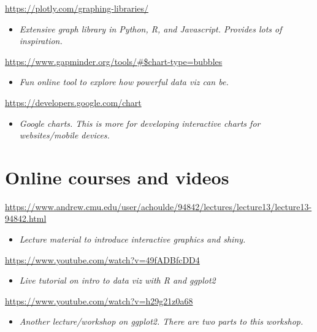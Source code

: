 \documentclass[
]{book}
\providecommand{\tightlist}{%
  \setlength{\itemsep}{0pt}\setlength{\parskip}{0pt}}
\begin{document}
\url{https://plotly.com/graphing-libraries/}

\begin{itemize}
\tightlist
\item
  \emph{Extensive graph library in Python, R, and Javascript. Provides lots of inspiration.}
\end{itemize}

\url{https://www.gapminder.org/tools/\#$chart-type=bubbles}

\begin{itemize}
\tightlist
\item
  \emph{Fun online tool to explore how powerful data viz can be.}
\end{itemize}

\url{https://developers.google.com/chart}

\begin{itemize}
\tightlist
\item
  \emph{Google charts. This is more for developing interactive charts for websites/mobile devices.}
\end{itemize}

\hypertarget{online-courses-and-videos}{%
\section{Online courses and videos}\label{online-courses-and-videos}}

\url{https://www.andrew.cmu.edu/user/achoulde/94842/lectures/lecture13/lecture13-94842.html}

\begin{itemize}
\tightlist
\item
  \emph{Lecture material to introduce interactive graphics and shiny.}
\end{itemize}

\url{https://www.youtube.com/watch?v=49fADBfcDD4}

\begin{itemize}
\tightlist
\item
  \emph{Live tutorial on intro to data viz with R and ggplot2}
\end{itemize}

\url{https://www.youtube.com/watch?v=h29g21z0a68}

\begin{itemize}
\tightlist
\item
  \emph{Another lecture/workshop on ggplot2. There are two parts to this workshop.}
\end{itemize}
\end{document}
